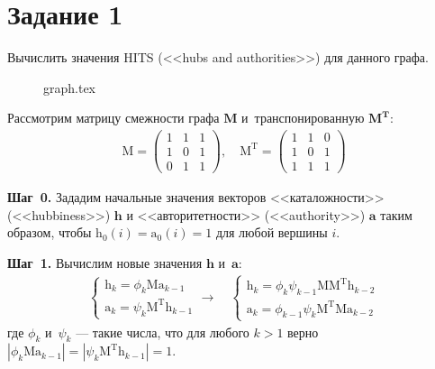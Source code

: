 \documentclass[class=article,crop=false]{standalone}
\begin{document}
    \section*{Задание 1}
    Вычислить значения HITS (<<hubs and authorities>>) для данного графа.

    \begin{figure*}[h]
        \centering
        {graph.tex}
    \end{figure*}

    \begin{multicols}{2}
        \noindent Рассмотрим матрицу смежности графа $\mathbf{M}$ и~транспонированную $\mathbf{M^T}$:
        \begin{gather*}
            \mathrm{M}=
            \begin{pmatrix}
                1 & 1 & 1 \\
                1 & 0 & 1 \\
                0 & 1 & 1
            \end{pmatrix},
            \quad
            \mathrm{M^T}=
            \begin{pmatrix}
                1 & 1 & 0 \\
                1 & 0 & 1 \\
                1 & 1 & 1
            \end{pmatrix}
        \end{gather*}

        \noindent\textbf{Шаг~0.} Зададим начальные значения векторов <<каталожности>> (<<hubbiness>>) $\mathbf{h}$ и <<авторитетности>> (<<authority>>) $\mathbf{a}$ таким образом, чтобы $\mathrm{h}_0\left( i\right) =\mathrm{a}_0\left( i\right) =1$ для любой вершины $i$.

        \noindent\textbf{Шаг~1.} Вычислим новые значения $\mathbf{h}$ и~$\mathbf{a}$:
        \begin{gather*}
            \begin{cases}
                \mathrm{h}_k=\phi_k\mathrm{M}\mathrm{a}_{k-1}\\
                \mathrm{a}_k=\psi_k\mathrm{M^T}\mathrm{h}_{k-1}
            \end{cases}
            \rightarrow\quad
            \begin{cases}
                \mathrm{h}_k=\phi_k\psi_{k-1}\mathrm{M M^T}\mathrm{h}_{k-2}\\
                \mathrm{a}_k=\phi_{k-1}\psi_k\mathrm{M^T M}\mathrm{a}_{k-2}
            \end{cases}
        \end{gather*}
        где $\phi_k$ и~$\psi_k$ --- такие числа, что для любого $k>1$ верно
        $\left|\phi_k\mathrm{M}\mathrm{a}_{k-1}\right| =\left|\psi_k\mathrm{M^T}\mathrm{h}_{k-1}\right| =1$.


\end{multicols}
\end{document}
